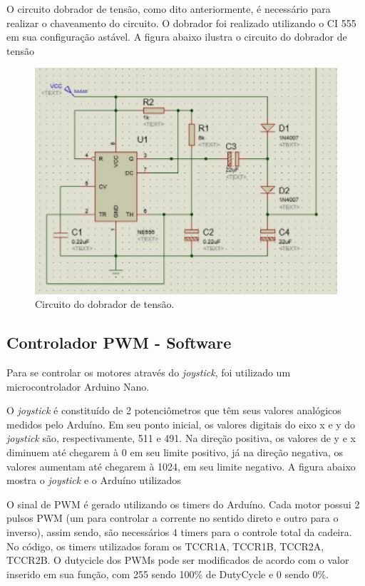 O circuito dobrador de tensão, como dito anteriormente, é necessário para
realizar o chaveamento do circuito. O dobrador foi realizado utilizando o CI
555 em sua configuração astável. A figura abaixo ilustra o circuito do dobrador de tensão

\begin{figure}[h!]
  \centering
  \includegraphics[width=1.0\textwidth]{figuras/Dobrador.jpg}
  \caption{Circuito do dobrador de tensão.}
\end{figure}

\subsection{Controlador PWM - Software}

Para se controlar os motores através do \textit{joystick}, foi utilizado um
microcontrolador Arduino Nano. 

O \textit{joystick} é constituído de 2 potenciômetros que têm seus valores
analógicos medidos pelo Arduíno. Em seu ponto inicial, os valores digitais do eixo x e y
do \textit{joystick} são, respectivamente, 511 e 491. Na direção positiva, os valores de
y e x diminuem até chegarem à 0 em seu limite positivo, já na direção negativa,
os valores aumentam até chegarem à 1024, em seu limite negativo. A figura
abaixo mostra o \textit{joystick} e o Arduíno utilizados

O sinal de PWM é gerado utilizando os timers do Arduíno. Cada motor possui 2 pulsos PWM (um para controlar a corrente no sentido direto e outro para o inverso), assim sendo, são necessários 4 timers para o controle total da cadeira. No código, os timers utilizados foram os TCCR1A, TCCR1B, TCCR2A, TCCR2B. O dutycicle dos PWMs pode ser modificados de acordo com o valor inserido em sua função, com 255 sendo 100\% de DutyCycle e 0 sendo 0\%.

